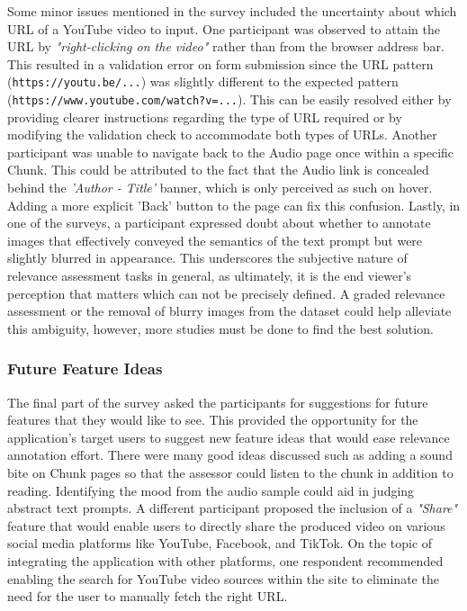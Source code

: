 \documentclass{l4proj}
\begin{document}
Some minor issues mentioned in the survey included the uncertainty about which URL of a YouTube video to input. One participant was observed to attain the URL by \emph{"right-clicking on the video"} rather than from the browser address bar. This resulted in a validation error on form submission since the URL pattern (\lstinline|https://youtu.be/...|) was slightly different to the expected pattern (\lstinline|https://www.youtube.com/watch?v=...|). This can be easily resolved either by providing clearer instructions regarding the type of URL required or by modifying the validation check to accommodate both types of URLs. Another participant was unable to navigate back to the Audio page once within a specific Chunk. This could be attributed to the fact that the Audio link is concealed behind the \emph{'Author - Title'} banner, which is only perceived as such on hover. Adding a more explicit 'Back' button to the page can fix this confusion. Lastly, in one of the surveys, a participant expressed doubt about whether to annotate images that effectively conveyed the semantics of the text prompt but were slightly blurred in appearance. This underscores the subjective nature of relevance assessment tasks in general, as ultimately, it is the end viewer's perception that matters which can not be precisely defined. A graded relevance assessment or the removal of blurry images from the dataset could help alleviate this ambiguity, however, more studies must be done to find the best solution.

\subsubsection{Future Feature Ideas}
The final part of the survey asked the participants for suggestions for future features that they would like to see. This provided the opportunity for the application's target users to suggest new feature ideas that would ease relevance annotation effort. There were many good ideas discussed such as adding a sound bite on Chunk pages so that the assessor could listen to the chunk in addition to reading. Identifying the mood from the audio sample could aid in judging abstract text prompts. A different participant proposed the inclusion of a \emph{"Share"} feature that would enable users to directly share the produced video on various social media platforms like YouTube, Facebook, and TikTok. On the topic of integrating the application with other platforms, one respondent recommended enabling the search for YouTube video sources within the site to eliminate the need for the user to manually fetch the right URL.
\end{document}

